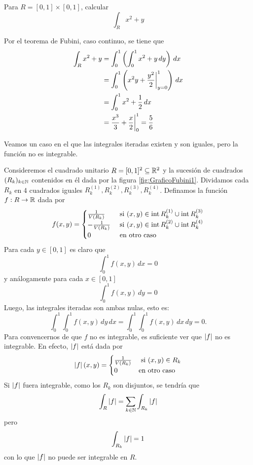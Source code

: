 \begin{ejemplo}
Para $ R = [0,1] \times [0,1] $, calcular
\[
    \int_R x^2 + y
\]
\begin{solucion}
Por el teorema de Fubini, caso continuo, se tiene que
\begin{align*}
    \int_R x^2 + y &= \int_0^1 \left(\int_0^1 x^2 + y \,dy\right) \,dx \\
        &= \int_0^1 \left(x^2 y + \frac{y^2}{2} \biggr |_{y=0}^1\right)\,dx \\
        &= \int_0^1 x^2 + \frac{1}{2} \, dx \\
        &= \frac{x^3}{3} + \frac{x}{2} \biggr |_0^1 = \frac{5}{6}
\end{align*}
\end{solucion}
\end{ejemplo}

\begin{ejemplo}\label{ej:ejemploRaroFubini}
Veamos un caso en el que las integrales iteradas existen y son
iguales, pero la funci\'on no es integrable.

Consideremos el cuadrado unitario $ R = [0,1]^2 \subseteq \mathbb{R}^2 $ y la sucesi\'on de cuadrados $(R_k)_{k\in \mathbb{N}} $ contenidos en \'el dada por la figura \ref{fig:GraficoFubini1}. Dividamos cada $R_k $ en 4 cuadrados iguales $ R_k^{(1)}, R_k^{(2)}, R_k^{(3)},R_k^{(4)} $. Definamos la funci\'on $ f:R \to \mathbb{R} $ dada por
\[
f(x,y) =
\begin{cases}
    \frac{1}{V(R_k)} & \text{ si } (x,y) \in \operatorname{int} R_k^{(1)}
    \cup \operatorname{int} R_k^{(3)} \\
    -\frac{1}{V(R_k)} & \text{ si } (x,y) \in \operatorname{int} R_k^{(2)}
    \cup \operatorname{int} R_k^{(4)} \\
    0 & \text{ en otro caso }
\end{cases}
\]
Para cada $ y \in [0,1] $ es claro que
\[
\int_0^1 f(x,y) \, dx = 0
\]
y an\'alogamente para cada $ x \in [0,1] $
\[
\int_0^1 f(x,y) \, dy = 0
\]
Luego, las integrales iteradas son ambas nulas, esto es:
\[
    \int_0^1 \int_0^1 f(x,y) \, dy \, dx
    = \int_0^1 \int_0^1 f(x,y) \, dx \, dy
    = 0.
\]
Para convencernos de que $ f $ no es integrable, es suficiente ver que $ \left\lvert f\right\rvert $ no es integrable. En efecto, $ \left\lvert f\right\rvert $ est\'a dada por
\[
\left\lvert f\right\rvert(x,y) =
\begin{cases}
\frac{1}{V(R_k)} & \text{ si } (x,y) \in R_k \\
0 & \text{en otro caso}
\end{cases}
\]
Si $ \left\lvert f\right\rvert $ fuera integrable, como los $R_k$ son disjuntos, se tendr\'ia que
\[
    \int_R \left\lvert f\right\rvert = \sum_{k \in \mathbb{N}} \int_{R_k} \left\lvert f\right\rvert
\]
pero
\[
    \int_{R_k} \left\lvert f\right\rvert = 1
\]
con lo que $ \left\lvert f\right\rvert $ no puede ser integrable en $ R $.
\end{ejemplo}

